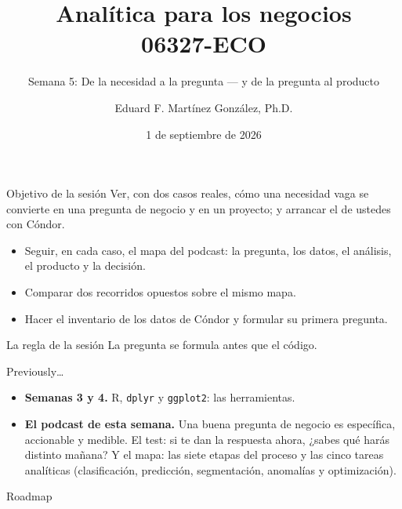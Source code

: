 \documentclass{beamer}
\title[06327-ECO]{Analítica para los negocios \\ 06327-ECO}
\subtitle{Semana 5: De la necesidad a la pregunta --- y de la pregunta al producto}
\author{Eduard F. Martínez González, Ph.D.}
\institute[]{Departamento de Economía, Universidad Icesi}
\date{1 de septiembre de 2026}
\begin{document}
\begin{frame}
\titlepage
\end{frame}

\begin{frame}{Objetivo de la sesión}
\small
Ver, con dos casos reales, cómo una necesidad vaga se convierte en una pregunta de negocio y en un proyecto; y arrancar el de ustedes con Cóndor.

\vspace{0.2cm}
\begin{itemize} \setlength{\itemsep}{0.18cm}
  \item Seguir, en cada caso, el mapa del podcast: la pregunta, los datos, el análisis, el producto y la decisión.
  \item Comparar dos recorridos opuestos sobre el mismo mapa.
  \item Hacer el inventario de los datos de Cóndor y formular su primera pregunta.
\end{itemize}

\vspace{0.2cm}
\begin{block}{La regla de la sesión}
La pregunta se formula antes que el código.
\end{block}
\end{frame}

\begin{frame}{Previously\ldots}
\small
\begin{itemize} \setlength{\itemsep}{0.25cm}
  \item \textbf{Semanas 3 y 4.} R, \texttt{dplyr} y \texttt{ggplot2}: las herramientas.
  \item \textbf{El podcast de esta semana.} Una buena pregunta de negocio es específica, accionable y medible. El test: si te dan la respuesta ahora, ¿sabes qué harás distinto mañana? Y el mapa: las siete etapas del proceso y las cinco tareas analíticas (clasificación, predicción, segmentación, anomalías y optimización).
\end{itemize}
\end{frame}

\begin{frame}[noframenumbering]{Roadmap}
\tableofcontents
\end{frame}

\end{document}
